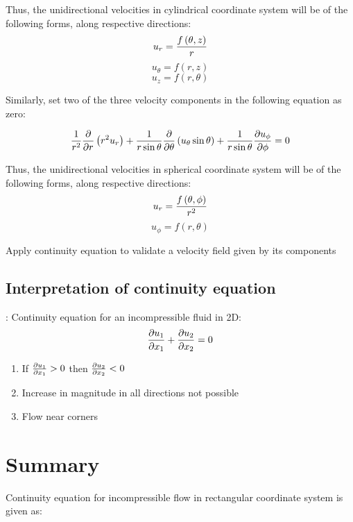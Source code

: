 Thus, the unidirectional velocities in cylindrical coordinate system will be of the following forms, along respective directions:
	$$ u_r = {f\left(\theta,z\right) \over r} $$
	$$ u_\theta = f\left(r, z \right) $$
	$$ u_z = f\left(r, \theta \right) $$


Similarly, set two of the three velocity components in the following equation as zero:

$$ {1 \over r^2} {\partial \over \partial r} \left( r^2 u_r \right) + {1 \over r \sin\theta} {\partial \over \partial \theta} \left( u_\theta \sin\theta \right) + {1 \over r \sin\theta} {\partial u_\phi \over \partial \phi} = 0 $$

Thus, the unidirectional velocities in spherical coordinate system will be of the following forms, along respective directions:
	$$ u_r = {f\left(\theta,\phi\right) \over r^2} $$
	$$ u_\phi = f\left(r, \theta \right) $$


\begin {lo3} 
Apply continuity equation to validate a velocity field given by its components
\end {lo3}

\subsection{Interpretation of continuity equation}:
Continuity equation for an incompressible fluid in 2D:
$$ {\partial u_1 \over \partial x_1} + {\partial u_2 \over \partial x_2} = 0 $$
\begin{enumerate}
\item If ${\partial u_1 \over \partial x_1} > 0$ then ${\partial u_2 \over \partial x_2} < 0$
\item Increase in magnitude in all directions not possible
\item Flow near corners
\end{enumerate}




\section{Summary}

Continuity equation for incompressible flow in rectangular coordinate system is given as: 

